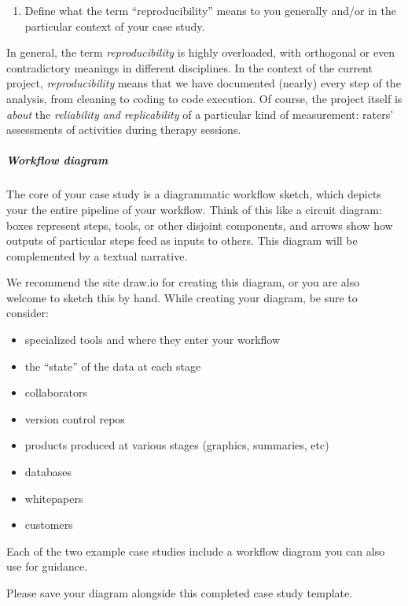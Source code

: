 \documentclass[]{article}
\begin{document}
\begin{enumerate}
\def\labelenumi{\arabic{enumi})}
\setcounter{enumi}{1}
\itemsep1pt\parskip0pt
\item
  Define what the term ``reproducibility'' means to you generally and/or
  in the particular context of your case study.
\end{enumerate}

In general, the term \emph{reproducibility} is highly overloaded, with
orthogonal or even contradictory meanings in different disciplines. In
the context of the current project, \emph{reproducibility} means that we
have documented (nearly) every step of the analysis, from cleaning to
coding to code execution. Of course, the project itself is \emph{about}
the \emph{reliability and replicability} of a particular kind of
measurement: raters' assessments of activities during therapy sessions.

\subparagraph{Workflow diagram}\label{workflow-diagram}

The core of your case study is a diagrammatic workflow sketch, which
depicts your the entire pipeline of your workflow. Think of this like a
circuit diagram: boxes represent steps, tools, or other disjoint
components, and arrows show how outputs of particular steps feed as
inputs to others. This diagram will be complemented by a textual
narrative.

We recommend the site draw.io for creating this diagram, or you are also
welcome to sketch this by hand. While creating your diagram, be sure to
consider:

\begin{itemize}
\itemsep1pt\parskip0pt
\item
  specialized tools and where they enter your workflow
\item
  the ``state'' of the data at each stage
\item
  collaborators
\item
  version control repos
\item
  products produced at various stages (graphics, summaries, etc)
\item
  databases
\item
  whitepapers
\item
  customers
\end{itemize}

Each of the two example case studies include a workflow diagram you can
also use for guidance.

Please save your diagram alongside this completed case study template.
\end{document}
